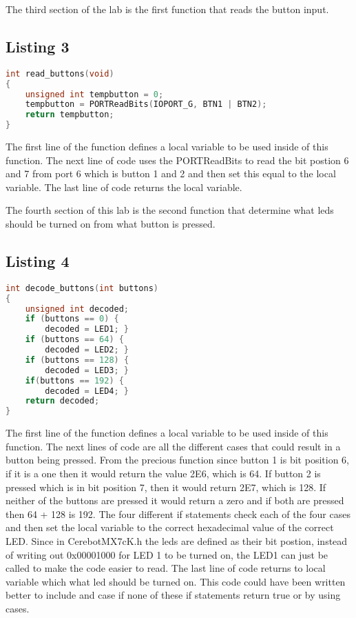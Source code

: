 \documentclass[11pt,a4]{report}
\begin{document}
The third section of the lab is the first function that reads the button input. 
\subsection{Listing 3}
\begin{lstlisting}[language=C]
int read_buttons(void)
{
    unsigned int tempbutton = 0;
    tempbutton = PORTReadBits(IOPORT_G, BTN1 | BTN2);
    return tempbutton;
}
\end{lstlisting}
The first line of the function defines a local variable to be used inside of this function. The next line of code uses the PORTReadBits to read the bit postion 6 and 7 from port 6 which is button 1 and 2 and then set this equal to the local variable. The last line of code returns the local variable. 

The fourth section of this lab is the second function that determine what leds should be turned on from what button is pressed. 
\subsection{Listing 4}
\begin{lstlisting}[language=C]
 int decode_buttons(int buttons)
{
    unsigned int decoded;
    if (buttons == 0) {
        decoded = LED1; }
    if (buttons == 64) {
        decoded = LED2; }
    if (buttons == 128) {
        decoded = LED3; }
    if(buttons == 192) {
        decoded = LED4; }
    return decoded;
}
\end{lstlisting}
The first line of the function defines a local variable to be used inside of this function. The next lines of code are all the different cases that could result in a button being pressed. From the precious function since button 1 is bit position 6, if it is a one then it would return the value 2E6, which is 64. If button 2 is pressed which is in bit position 7, then it would return 2E7, which is 128. If neither of the buttons are pressed it would return a zero and if both are pressed then 64 + 128 is 192. The four different if statements check each of the four cases and then set the local variable to the correct hexadecimal value of the correct LED. Since in CerebotMX7cK.h the leds are defined as their bit postion, instead of writing out 0x00001000 for LED 1 to be turned on, the LED1 can just be called to make the code easier to read. The last line of code returns to local variable which what led should be turned on. This code could have been written better to include and case if none of these if statements return true or by using cases. 
\end{document}
